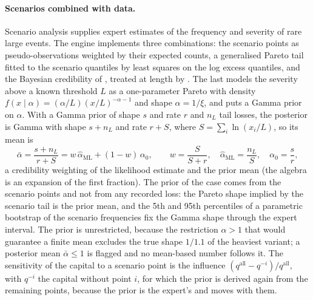 \paragraph{Scenarios combined with data.} Scenario analysis supplies expert estimates of the frequency and severity of rare large
events. The engine implements three combinations: the scenario points as pseudo-observations weighted by their expected counts, a
generalised Pareto tail fitted to the scenario quantiles by least squares on the log excess quantiles, and the Bayesian
credibility of \citet{oprisk:shevchenko2006}, treated at length by \citet{oprisk:shevchenko2011}. The last models the severity above a
known threshold $L$ as a one-parameter Pareto with density $f(x\mid\alpha)=(\alpha/L)(x/L)^{-\alpha-1}$ and shape $\alpha=1/\xi$, and
puts a Gamma prior on $\alpha$. With a Gamma prior of shape $s$ and rate $r$ and $n_L$ tail losses, the posterior is Gamma with shape
$s+n_L$ and rate $r+S$, where $S=\sum_i\ln(x_i/L)$, so its mean is
\begin{equation}
\bar\alpha=\frac{s+n_L}{r+S}=w\,\hat\alpha_{\mathrm{ML}}+(1-w)\,\alpha_0,\qquad w=\frac{S}{S+r},\quad\hat\alpha_{\mathrm{ML}}=\frac{n_L}{S},\quad\alpha_0=\frac{s}{r},
\label{eq:op-credibility}
\end{equation}
a credibility weighting of the likelihood estimate and the prior mean (the algebra is an expansion of the first fraction). The
prior of the case comes from the scenario points and not from any recorded loss: the Pareto shape implied by the scenario
tail is the prior mean, and the 5th and 95th percentiles of a parametric bootstrap of the scenario frequencies fix the Gamma
shape through the expert interval. The prior is unrestricted, because the restriction $\alpha>1$ that would guarantee a finite mean
excludes the true shape $1/1.1$ of the heaviest variant; a posterior mean $\bar\alpha\le1$ is flagged and no mean-based number follows it.
The sensitivity of the capital to a scenario point is the influence $(q^{\mathrm{all}}-q^{-i})/q^{\mathrm{all}}$, with $q^{-i}$ the capital
without point $i$, for which the prior is derived again from the remaining points, because the prior is the expert's and moves with them.

